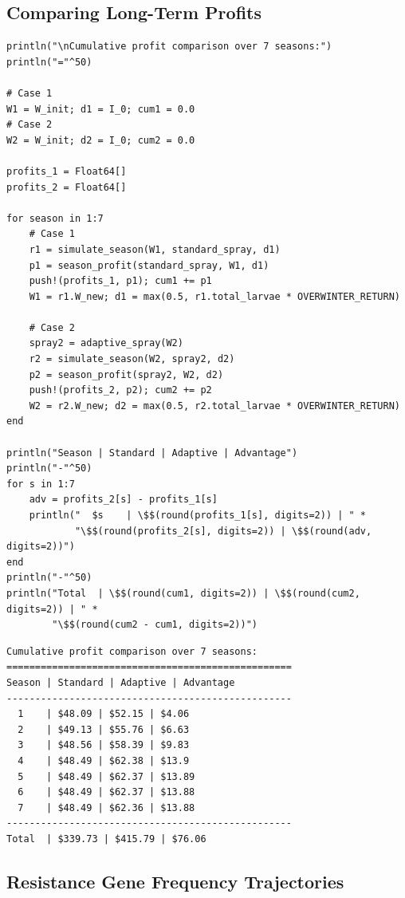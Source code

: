 \subsection{Comparing Long-Term Profits}



\label{10148880564235560532}{}



\begin{verbatim}
println("\nCumulative profit comparison over 7 seasons:")
println("="^50)

# Case 1
W1 = W_init; d1 = I_0; cum1 = 0.0
# Case 2
W2 = W_init; d2 = I_0; cum2 = 0.0

profits_1 = Float64[]
profits_2 = Float64[]

for season in 1:7
    # Case 1
    r1 = simulate_season(W1, standard_spray, d1)
    p1 = season_profit(standard_spray, W1, d1)
    push!(profits_1, p1); cum1 += p1
    W1 = r1.W_new; d1 = max(0.5, r1.total_larvae * OVERWINTER_RETURN)

    # Case 2
    spray2 = adaptive_spray(W2)
    r2 = simulate_season(W2, spray2, d2)
    p2 = season_profit(spray2, W2, d2)
    push!(profits_2, p2); cum2 += p2
    W2 = r2.W_new; d2 = max(0.5, r2.total_larvae * OVERWINTER_RETURN)
end

println("Season | Standard | Adaptive | Advantage")
println("-"^50)
for s in 1:7
    adv = profits_2[s] - profits_1[s]
    println("  $s    | \$$(round(profits_1[s], digits=2)) | " *
            "\$$(round(profits_2[s], digits=2)) | \$$(round(adv, digits=2))")
end
println("-"^50)
println("Total  | \$$(round(cum1, digits=2)) | \$$(round(cum2, digits=2)) | " *
        "\$$(round(cum2 - cum1, digits=2))")
\end{verbatim}




\begin{verbatim}
Cumulative profit comparison over 7 seasons:
==================================================
Season | Standard | Adaptive | Advantage
--------------------------------------------------
  1    | $48.09 | $52.15 | $4.06
  2    | $49.13 | $55.76 | $6.63
  3    | $48.56 | $58.39 | $9.83
  4    | $48.49 | $62.38 | $13.9
  5    | $48.49 | $62.37 | $13.89
  6    | $48.49 | $62.37 | $13.88
  7    | $48.49 | $62.36 | $13.88
--------------------------------------------------
Total  | $339.73 | $415.79 | $76.06
\end{verbatim}



\subsection{Resistance Gene Frequency Trajectories}



